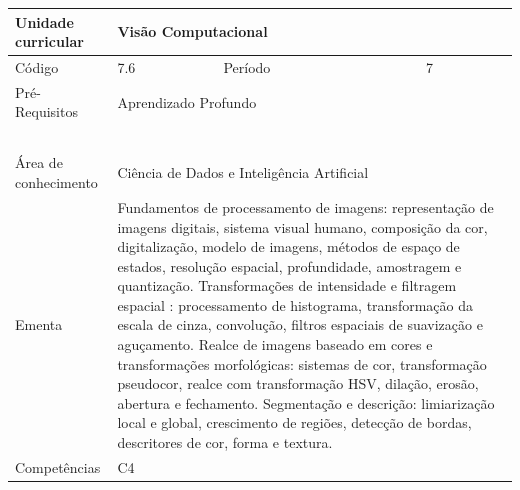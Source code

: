 \begin{quadro}[ht!]
  \centering\scriptsize
\caption{Unidade Curricular Visão Computacional}

\begin{tabular}{|p{2.5cm}|p{2.5cm}|p{2.5cm}|p{2.5cm}|p{2.5cm}|}\hline

  Unidade curricular & \multicolumn{4}{p{10cm}|}{ Visão Computacional }\\\hline
  Código & 7.6 & Período & \multicolumn{2}{p{5cm}|}{ 7 }\\\hline
  Pré-Requisitos & \multicolumn{4}{p{10cm}|}{ Aprendizado Profundo } \\\hline
  \cellcolor{blue1}{ CH PRESENCIAL } &
    \cellcolor{blue1}{CH EAD Síncrona} &
    \cellcolor{blue1}{CH EAD Síncrona Mediada} &
    \cellcolor{blue1}{CH EAD Assíncrona} &
    \cellcolor{blue1}{CH APCC} \\\hline
  \cellcolor{blue1}{ 60 } &
    \cellcolor{blue1}{ 0 } &
    \cellcolor{blue1}{ 0 } &
    \cellcolor{blue1}{ 0 } &
    \cellcolor{blue1}{0} \\\hline
  \cellcolor{blue1}{ CH Teórica } &
    \cellcolor{blue1}{CH Prática} &
    \cellcolor{blue1}{CH Humanidades} &
    \cellcolor{blue1}{CH Extensão} &
    \cellcolor{blue1}{CH EAD TOTAL} \\\hline
  \cellcolor{blue1}{ 30 } &
    \cellcolor{blue1}{ 30 } &
    \cellcolor{blue1}{ 0 } &
    \cellcolor{blue1}{ 0 } &
    \cellcolor{blue1}{ 0 } \\\hline
  \cellcolor{blue1}{CARGA-HORÁRIA TOTAL} & \multicolumn{4}{p{10cm}|}{ \cellcolor{blue1}{ 60 } } \\\hline
  Área de conhecimento & \multicolumn{4}{p{10cm}|}{ Ciência de Dados e Inteligência Artificial } \\\hline
  Ementa & \multicolumn{4}{p{10cm}|}{ Fundamentos de processamento de imagens: representação de imagens digitais, sistema visual humano, composição da cor, digitalização, modelo de imagens, métodos de espaço de estados, resolução espacial, profundidade, amostragem e quantização. Transformações de intensidade e filtragem espacial : processamento de histograma, transformação da escala de cinza, convolução, filtros espaciais de suavização e aguçamento. Realce de imagens baseado em cores e transformações morfológicas: sistemas de cor, transformação pseudocor, realce com transformação HSV, dilação, erosão, abertura e fechamento. Segmentação e descrição: limiarização local e global, crescimento de regiões, detecção de bordas, descritores de cor, forma e textura. } \\\hline
  Competências & \multicolumn{4}{p{10cm}|}{ C4 } \\\hline


  
	\end{tabular}

\end{quadro}


